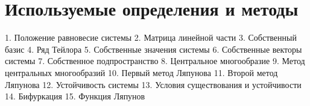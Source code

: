 \chapter{Используемые определения и методы}
1. Положение равновесие системы
2. Матрица линейной части
3. Собственный базис
4. Ряд Тейлора
5. Собственные значения системы
6. Собственные векторы системы
7. Собственное подпространство
8. Центральное многообразие
9. Метод центральных многообразий
10. Первый метод Ляпунова
11. Второй метод Ляпунова
12. Устойчивость системы
13. Условия существования и устойчивости
14. Бифуркация 
15. Функция Ляпунов

